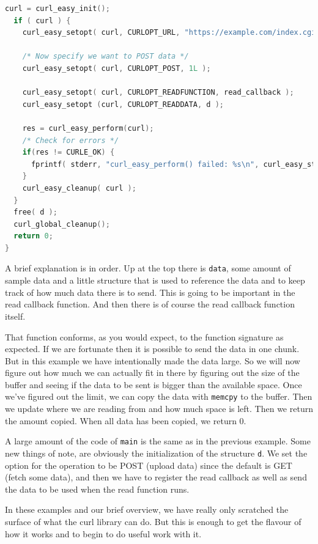 \documentclass[a4paper]{report}
\begin{document}
\begin{lstlisting}[language=C]
  curl = curl_easy_init();
  if ( curl ) {
    curl_easy_setopt( curl, CURLOPT_URL, "https://example.com/index.cgi" );
 
    /* Now specify we want to POST data */ 
    curl_easy_setopt( curl, CURLOPT_POST, 1L );
 
    curl_easy_setopt( curl, CURLOPT_READFUNCTION, read_callback );
    curl_easy_setopt (curl, CURLOPT_READDATA, d );
 
    res = curl_easy_perform(curl);
    /* Check for errors */ 
    if(res != CURLE_OK) {
      fprintf( stderr, "curl_easy_perform() failed: %s\n", curl_easy_strerror( res ) );
    }  
    curl_easy_cleanup( curl );
  }
  free( d );
  curl_global_cleanup();
  return 0;
}
\end{lstlisting}

A brief explanation is in order. Up at the top there is \texttt{data}, some amount of sample data and a little structure that is used to reference the data and to keep track of how much data there is to send. This is going to be important in the read callback function. And then there is of course the read callback function itself.

That function conforms, as you would expect, to the function signature as expected. If we are fortunate then it is possible to send the data in one chunk. But in this example we have intentionally made the data large. So we will now figure out how much we can actually fit in there by figuring out the size of the buffer and seeing if the data to be sent is bigger than the available space. Once we've figured out the limit, we can copy the data with \texttt{memcpy} to the buffer. Then we update where we are reading from and how much space is left. Then we return the amount copied. When all data has been copied, we return 0.

A large amount of the code of \texttt{main} is the same as in the previous example. Some new things of note, are obviously the initialization of the structure \texttt{d}. We set the option for the operation to be POST (upload data) since the default is GET (fetch some data), and then we have to register the read callback as well as send the data to be used when the read function runs.

In these examples and our brief overview, we have really only scratched the surface of what the curl library can do. But this is enough to get the flavour of how it works and to begin to do useful work with it.
\end{document}
